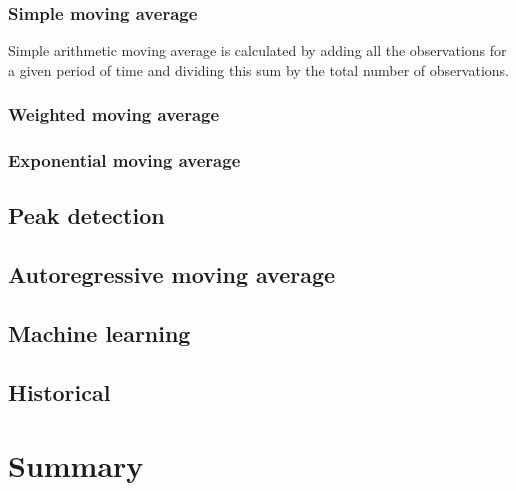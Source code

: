 		\subsubsection{Simple moving average}
		Simple arithmetic moving average is calculated by adding all the observations for a given period of time and dividing this sum by the total number of observations.
		\subsubsection{Weighted moving average}
		\subsubsection{Exponential moving average}
		\subsection{Peak detection}
		\subsection{Autoregressive moving average}
	\subsection{Machine learning}
	\subsection{Historical}
\section{Summary}